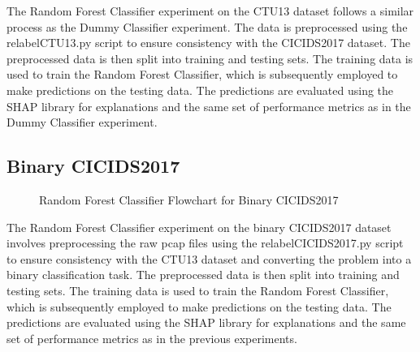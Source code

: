 The Random Forest Classifier experiment on the CTU13 dataset follows a similar process as the Dummy Classifier experiment. The data is preprocessed using the relabelCTU13.py script to ensure consistency with the CICIDS2017 dataset. The preprocessed data is then split into training and testing sets. The training data is used to train the Random Forest Classifier, which is subsequently employed to make predictions on the testing data. The predictions are evaluated using the SHAP library for explanations and the same set of performance metrics as in the Dummy Classifier experiment.

\subsection{Binary CICIDS2017}
\begin{figure}[H]
\centering
{}
\caption{Random Forest Classifier Flowchart for Binary CICIDS2017}\label{fig:RandomForestFlowBinaryCICIDS2017}
\end{figure}

The Random Forest Classifier experiment on the binary CICIDS2017 dataset involves preprocessing the raw pcap files using the relabelCICIDS2017.py script to ensure consistency with the CTU13 dataset and converting the problem into a binary classification task. The preprocessed data is then split into training and testing sets. The training data is used to train the Random Forest Classifier, which is subsequently employed to make predictions on the testing data. The predictions are evaluated using the SHAP library for explanations and the same set of performance metrics as in the previous experiments.

